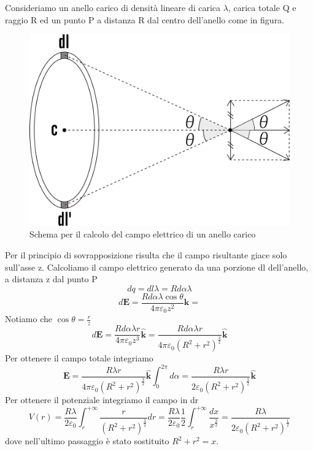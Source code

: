 \documentclass[
10pt, %
a4paper, %
oneside, %
headinclude,footinclude, %
BCOR5mm, %
]{scrartcl}
\begin{document}
\begin{esercizio}
Consideriamo un anello carico di densità lineare di carica $\lambda$, carica totale Q e raggio R ed un punto P a distanza R dal centro dell'anello come in figura.
\begin{figure}[h!]
	\centering
	\includegraphics[width=0.6\linewidth]{images/anello}
	\caption{Schema per il calcolo del campo elettrico di un anello carico}
	\label{fig:anello}
\end{figure}
\FloatBarrier
Per il principio di sovrapposizione risulta che il campo risultante giace solo sull'asse z. Calcoliamo il campo elettrico generato da una porzione dl dell'anello, a distanza z dal punto P
\[dq = dl\lambda = R d\alpha \lambda\] 
\[d\mathbf{E} = \frac{ R d\alpha\lambda \cos\theta}{4\pi\varepsilon_0z^2}\hat{\mathbf{k}} = \]
Notiamo che $\cos\theta = \frac{r}{z}$
\[d\mathbf{E} = \frac{ R d\alpha\lambda r }{4\pi\varepsilon_0 z^3}\hat{\mathbf{k}} = \frac{ R d\alpha\lambda r }{4\pi\varepsilon_0 (R^2+r^2)^{\frac{3}{2}}}\hat{\mathbf{k}}\]
Per ottenere il campo totale integriamo 
\[\mathbf{E} = \frac{ R \lambda r }{4\pi\varepsilon_0 (R^2+r^2)^{\frac{3}{2}}}\hat{\mathbf{k}}\int_{0}^{2\pi}d\alpha= \frac{ R \lambda r }{2\varepsilon_0 (R^2+r^2)^{\frac{3}{2}}}\hat{\mathbf{k}} \]
Per ottenere il potenziale integriamo il campo in dr
\[V(r) = \frac{R \lambda}{2\varepsilon_0}\int_{r}^{+\infty}\frac{  r }{ (R^2+r^2)^{\frac{3}{2}}} dr= \frac{R \lambda}{2\varepsilon_0}\frac{1}{2}\int_{r}^{+\infty}\frac{ dx }{ x^{\frac{3}{2}}} = \frac{ R \lambda }{2\varepsilon_0 (R^2+r^2)^{\frac{1}{2}}}\]
dove nell'ultimo passaggio è stato sostituito \(R^2+r^2 = x\).
\end{esercizio}
\end{document}
